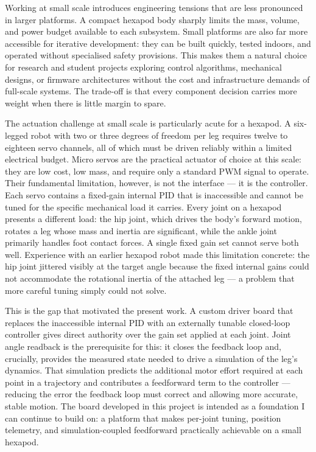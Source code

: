 Working at small scale introduces engineering tensions that are less pronounced in larger platforms. A compact hexapod body sharply limits the mass, volume, and power budget available to each subsystem. Small platforms are also far more accessible for iterative development: they can be built quickly, tested indoors, and operated without specialised safety provisions. This makes them a natural choice for research and student projects exploring control algorithms, mechanical designs, or firmware architectures without the cost and infrastructure demands of full-scale systems. The trade-off is that every component decision carries more weight when there is little margin to spare.

The actuation challenge at small scale is particularly acute for a hexapod. A six-legged robot with two or three degrees of freedom per leg requires twelve to eighteen servo channels, all of which must be driven reliably within a limited electrical budget. Micro servos are the practical actuator of choice at this scale: they are low cost, low mass, and require only a standard PWM signal to operate. Their fundamental limitation, however, is not the interface — it is the controller. Each servo contains a fixed-gain internal PID that is inaccessible and cannot be tuned for the specific mechanical load it carries. Every joint on a hexapod presents a different load: the hip joint, which drives the body's forward motion, rotates a leg whose mass and inertia are significant, while the ankle joint primarily handles foot contact forces. A single fixed gain set cannot serve both well. Experience with an earlier hexapod robot made this limitation concrete: the hip joint jittered visibly at the target angle because the fixed internal gains could not accommodate the rotational inertia of the attached leg — a problem that more careful tuning simply could not solve.

This is the gap that motivated the present work. A custom driver board that replaces the inaccessible internal PID with an externally tunable closed-loop controller gives direct authority over the gain set applied at each joint. Joint angle readback is the prerequisite for this: it closes the feedback loop and, crucially, provides the measured state needed to drive a simulation of the leg's dynamics. That simulation predicts the additional motor effort required at each point in a trajectory and contributes a feedforward term to the controller — reducing the error the feedback loop must correct and allowing more accurate, stable motion. The board developed in this project is intended as a foundation I can continue to build on: a platform that makes per-joint tuning, position telemetry, and simulation-coupled feedforward practically achievable on a small hexapod.


